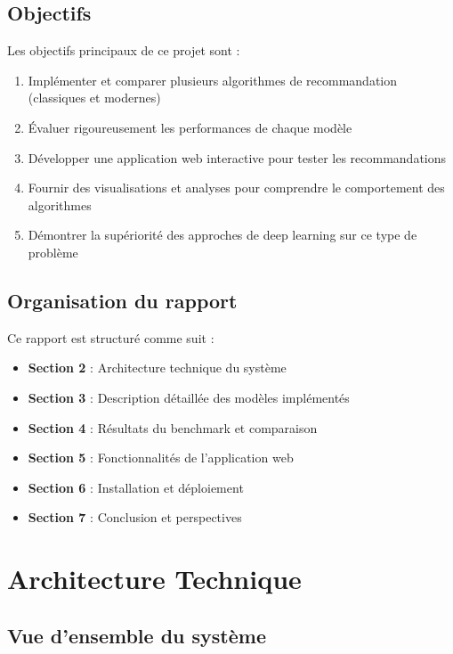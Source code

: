 \documentclass[12pt,a4paper]{article}
\begin{document}
\subsection{Objectifs}

Les objectifs principaux de ce projet sont :

\begin{enumerate}
    \item Implémenter et comparer plusieurs algorithmes de recommandation (classiques et modernes)
    \item Évaluer rigoureusement les performances de chaque modèle
    \item Développer une application web interactive pour tester les recommandations
    \item Fournir des visualisations et analyses pour comprendre le comportement des algorithmes
    \item Démontrer la supériorité des approches de deep learning sur ce type de problème
\end{enumerate}

\subsection{Organisation du rapport}

Ce rapport est structuré comme suit :
\begin{itemize}
    \item \textbf{Section 2} : Architecture technique du système
    \item \textbf{Section 3} : Description détaillée des modèles implémentés
    \item \textbf{Section 4} : Résultats du benchmark et comparaison
    \item \textbf{Section 5} : Fonctionnalités de l'application web
    \item \textbf{Section 6} : Installation et déploiement
    \item \textbf{Section 7} : Conclusion et perspectives
\end{itemize}

\section{Architecture Technique}

\subsection{Vue d'ensemble du système}
\end{document}
